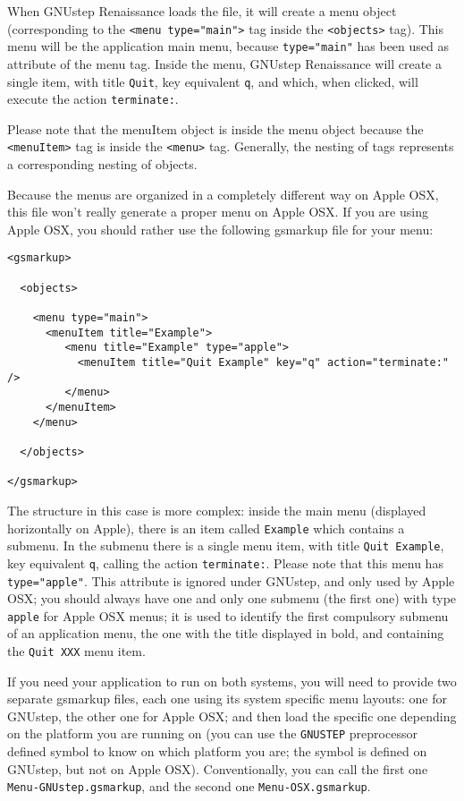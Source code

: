 \documentclass[a4paper]{article}
\begin{document}
When GNUstep Renaissance loads the file, it will create a menu object
(corresponding to the \texttt{<menu type="main">} tag inside the
\texttt{<objects>} tag).  This menu will be the application main menu,
because \texttt{type="main"} has been used as attribute of the menu
tag.  Inside the menu, GNUstep Renaissance will create a single item,
with title \texttt{Quit}, key equivalent \texttt{q}, and which, when
clicked, will execute the action \texttt{terminate:}.

Please note that the menuItem object is inside the menu object because
the \texttt{<menuItem>} tag is inside the \texttt{<menu>} tag.
Generally, the nesting of tags represents a corresponding nesting of
objects.

Because the menus are organized in a completely different way on Apple
OSX, this file won't really generate a proper menu on Apple OSX.  If
you are using Apple OSX, you should rather use the following gsmarkup
file for your menu:
\begin{verbatim}
<gsmarkup>

  <objects>

    <menu type="main">
      <menuItem title="Example">
         <menu title="Example" type="apple">
           <menuItem title="Quit Example" key="q" action="terminate:" />
         </menu>
      </menuItem>
    </menu>
 
  </objects>

</gsmarkup>
\end{verbatim}
The structure in this case is more complex: inside the main menu
(displayed horizontally on Apple), there is an item called
\texttt{Example} which contains a submenu.  In the submenu 
there is a single menu item, with title \texttt{Quit Example}, key
equivalent \texttt{q}, calling the action \texttt{terminate:}.  Please
note that this menu has \texttt{type="apple"}.  This attribute is
ignored under GNUstep, and only used by Apple OSX; you should always
have one and only one submenu (the first one) with type
\texttt{apple} for Apple OSX menus; it is used to identify 
the first compulsory submenu of an application menu, the one with the
title displayed in bold, and containing the \texttt{Quit XXX} menu
item.

If you need your application to run on both systems, you will need to
provide two separate gsmarkup files, each one using its system
specific menu layouts: one for GNUstep, the other one for Apple OSX;
and then load the specific one depending on the platform you are
running on (you can use the \texttt{GNUSTEP} preprocessor defined
symbol to know on which platform you are; the symbol is defined on
GNUstep, but not on Apple OSX).  Conventionally, you can call the
first one \texttt{Menu-GNUstep.gsmarkup}, and the second one
\texttt{Menu-OSX.gsmarkup}.
\end{document}
